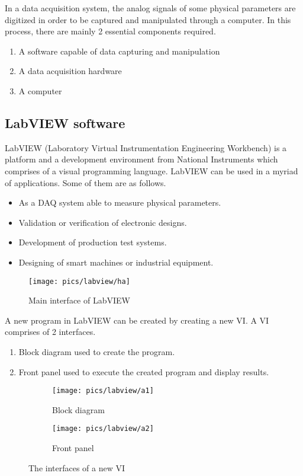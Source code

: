 In a data acquisition system, the analog signals of some physical parameters are digitized in order to be captured and manipulated through a computer. In this process, there are mainly 2 essential components required.  

\begin{enumerate}
	\item A software capable of data capturing and manipulation
	\item A data acquisition hardware
	\item A computer 
\end{enumerate}

\subsection{LabVIEW software}

LabVIEW (Laboratory Virtual Instrumentation Engineering Workbench) is a platform and a development environment from National Instruments which comprises of a visual programming language. LabVIEW can be used in a myriad of applications. Some of them are as follows.
\begin{itemize}
	\item As a DAQ system able to measure physical parameters.
	\item Validation or verification of electronic designs.
	\item Development of production test systems.
	\item Designing of smart machines or industrial equipment.
\end{itemize} 

\begin{figure}[!h]
	\centering
	\texttt{[image: pics/labview/ha]}
	\caption{Main interface of LabVIEW}
	\label{fig:ha}
\end{figure}

\noindent
A new program in LabVIEW can be created by creating a new VI. A VI comprises of 2 interfaces.
\begin{enumerate}
	\item Block diagram used to create the program.
	\item Front panel used to execute the created program and display results.
\end{enumerate}

\pagebreak
\begin{figure}[!h]
	\centering
	\begin{subfigure}{.5\textwidth}
		\centering
		\texttt{[image: pics/labview/a1]}
		\caption{Block diagram}
		\label{fig:sub1}
	\end{subfigure}%
	\begin{subfigure}{.5\textwidth}
		\centering
		\texttt{[image: pics/labview/a2]}
		\caption{Front panel}
		\label{fig:sub2}
	\end{subfigure}
	\caption{The interfaces of a new VI}
	\label{fig:animals}
\end{figure}

